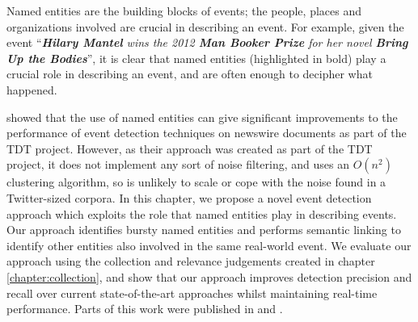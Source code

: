 
Named entities are the building blocks of events; the people, places and organizations involved are crucial in describing an event.
For example, given the event ``\textit{\textbf{Hilary Mantel} wins the 2012 \textbf{Man Booker Prize} for her novel \textbf{Bring Up the Bodies}}'', it is clear that named entities (highlighted in bold) play a crucial role in describing an event, and are often enough to decipher what happened.

\cite{Kumaran:2004:TCN:1008992.1009044, Kumaran2005} showed that the use of named entities can give significant improvements to the performance of event detection techniques on newswire documents as part of the TDT project.
However, as their approach was created as part of the TDT project, it does not implement any sort of noise filtering, and uses an $O(n^2)$ clustering algorithm,  so is unlikely to scale or cope with the noise found in a Twitter-sized corpora.
In this chapter, we propose a novel event detection approach which exploits the role that named entities play in describing events.
Our approach identifies bursty named entities and performs semantic linking to identify other entities also involved in the same real-world event.
We evaluate our approach using the collection and relevance judgements created in chapter \ref{chapter:collection}, and show that our approach improves detection precision and recall over current state-of-the-art approaches whilst maintaining real-time performance.
Parts of this work were published in \cite{McMinn15} and \cite{McMinn14}.